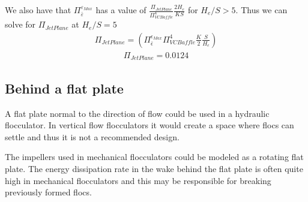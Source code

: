 \documentclass[letterpaper,10pt,english]{sphinxmanual}
\begin{document}
We also have that \(\Pi_{\bar \varepsilon}^{\varepsilon_{Max}}\) has a value of
\(\frac{\Pi_{JetPlane}}{\Pi_{VCBaffle}^4} \frac{2 H_e}{K S}\) for
\(H_e/S>5\). Thus we can solve for \(\Pi_{JetPlane}\) at
\(H_e/S=5\)
\begin{equation}\label{equation:Rapid_Mix/RM_Derivations:Rapid_Mix/RM_Derivations:131}
\begin{split}\Pi_{JetPlane} = \left(
  \Pi_{\bar \epsilon}^{\epsilon_{Max}} \Pi_{VCBaffle}^4 \frac{K}{2} \frac{S}{H_e}
  \right)\end{split}
\end{equation}\begin{equation}\label{equation:Rapid_Mix/RM_Derivations:Rapid_Mix/RM_Derivations:132}
\begin{split}\Pi_{JetPlane} = 0.0124\end{split}
\end{equation}
%
\begin{sphinxVerbatim}[commandchars=\\\{\}]
    

\end{sphinxVerbatim}


\subsection{Behind a flat plate}
\label{\detokenize{Rapid_Mix/RM_Derivations:behind-a-flat-plate}}\label{\detokenize{Rapid_Mix/RM_Derivations:heading-behind-a-flat-plate}}
A flat plate normal to the direction of flow could be used in a hydraulic flocculator. In vertical flow flocculators it would create a space where flocs can settle and thus it is not a recommended design.

The impellers used in mechanical flocculators could be modeled as a rotating flat plate. The energy dissipation rate in the wake behind the flat plate is often quite high in mechanical flocculators and this may be responsible for breaking previously formed flocs.
\end{document}
